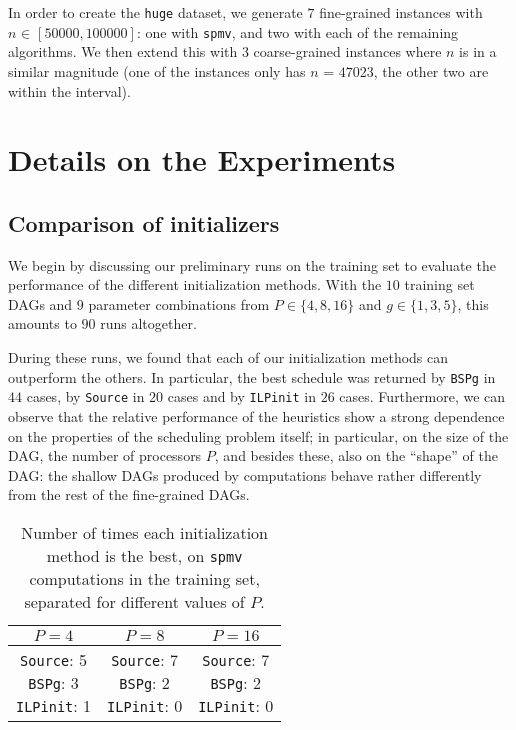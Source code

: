 \documentclass[sigconf,nonacm]{acmart}
\begin{document}
In order to create the \texttt{huge} dataset, we generate $7$ fine-grained instances with $n _{\!} \in _{\!} [50000, 100000]$: one with \texttt{spmv}, and two with each of the remaining algorithms. We then extend this with $3$ coarse-grained instances where $n$ is in a similar magnitude (one of the instances only has $n_{\!}=_{\!}47023$, the other two are within the interval).

\section{Details on the Experiments} \label{app:exps}

\subsection{Comparison of initializers}

We begin by discussing our preliminary runs on the training set to evaluate the performance of the different initialization methods. With the $10$ training set DAGs and $9$ parameter combinations from $P \in \{ 4, 8, 16\}$ and $g \in \{1, 3, 5\}$, this amounts to $90$ runs altogether.

During these runs, we found that each of our initialization methods can outperform the others. In particular, the best schedule was returned by \texttt{BSPg} in $44$ cases, by \texttt{Source} in $20$ cases and by \texttt{ILPinit} in $26$ cases. Furthermore, we can observe that the relative performance of the heuristics show a strong dependence on the properties of the scheduling problem itself; in particular, on the size of the DAG, the number of processors $P$, and besides these, also on the ``shape'' of the DAG: the shallow DAGs produced by  computations behave rather differently from the rest of the fine-grained DAGs.

\begin{table}
\centering
\caption{Number of times each initialization method is the best, on \texttt{spmv} computations in the training set, separated for different values of $P$.}
\renewcommand{\arraystretch}{1.65}
\begin{tabular}{| c | c | c|}
 $P=4$ & $P=8$ & $P=16$ \\ [0.5ex] 
 \hline\hline
 \makecell{\texttt{Source}: 5 \\ \texttt{BSPg}: 3 \\ \texttt{ILPinit}: 1} & \makecell{\texttt{Source}: 7 \\ \texttt{BSPg}: 2 \\ \texttt{ILPinit}: 0} & \makecell{\texttt{Source}: 7 \\ \texttt{BSPg}: 2 \\ \texttt{ILPinit}: 0} \\ 
 \hline
\end{tabular}
\label{tab:training_spmv}
\end{table}
\end{document}
